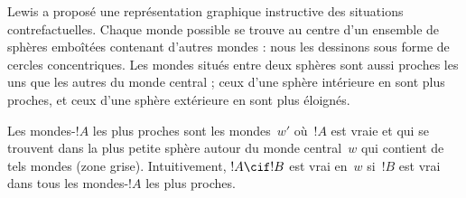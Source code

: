 \documentclass[../../../include/open-logic-section]{subfiles}
\begin{document}
Lewis a proposé une représentation graphique instructive des
situations contrefactuelles. Chaque monde possible se trouve au
centre d'un ensemble de sphères emboîtées contenant d'autres mondes :
nous les dessinons sous forme de cercles concentriques. Les mondes
situés entre deux sphères sont aussi proches les uns que les autres
du monde central ; ceux d'une sphère intérieure en sont plus proches,
et ceux d'une sphère extérieure en sont plus éloignés.
\begin{center}
\end{center}
Les mondes-$!A$ les plus proches sont les mondes~$w'$ où~$!A$ est vraie
et qui se trouvent dans la plus petite sphère autour du monde
central~$w$ qui contient de tels mondes (zone grise). Intuitivement,
$!A \cif !B$ est vrai en~$w$ si~$!B$ est vrai dans tous les mondes-$!A$
les plus proches.
\end{document}
